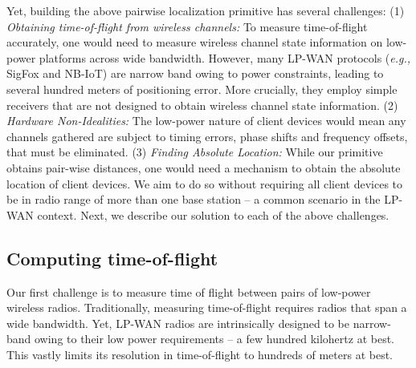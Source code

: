 Yet, building the above pairwise localization primitive has several challenges: (1) {\it Obtaining  time-of-flight from wireless channels: } To measure time-of-flight accurately, one would need to measure wireless channel state information on low-power platforms across wide bandwidth. However, many LP-WAN protocols (\emph{e.g.,} SigFox and NB-IoT) are narrow band owing to power constraints, leading to several hundred meters of positioning error. More crucially, they employ simple receivers that are not designed to obtain wireless channel state information. (2)  {\it Hardware Non-Idealities: } The low-power nature of client devices would mean any channels gathered are subject to timing errors, phase shifts and frequency offsets, that must be eliminated. (3) {\it Finding Absolute Location: } While our primitive obtains pair-wise distances, one would need a mechanism to obtain the absolute location of client devices. We aim to do so without requiring all client devices to be in radio range of more than one base station -- a common scenario in the LP-WAN context. Next, we describe our solution to each of the above challenges.  




\subsection{Computing time-of-flight}
Our first challenge is to measure time of flight between pairs of low-power wireless radios. Traditionally, measuring time-of-flight requires radios that span a wide bandwidth. Yet, LP-WAN radios are intrinsically designed to be narrow-band owing to their low power requirements  -- a few hundred kilohertz at best. This vastly limits its resolution in  time-of-flight to hundreds of meters at best. 

